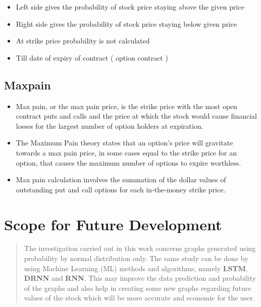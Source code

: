 \begin{multicols}{2}

\begin{itemize}
\tightlist
\item
  Left side gives the probability of stock price staying above the given
  price
\item
  Right side gives the probability of stock price staying below given
  price
\item
  At strike price probability is not calculated
\item
  Till date of expiry of contract ( option contract )
\end{itemize}

\hypertarget{maxpain}{%
\subsection{Maxpain}\label{maxpain}}

\begin{itemize}
\tightlist
\item
  Max pain, or the max pain price, is the strike price with the most
  open contract puts and calls and the price at which the stock would
  cause financial losses for the largest number of option holders at
  expiration.
\item
  The Maximum Pain theory states that an option's price will gravitate
  towards a max pain price, in some cases equal to the strike price for
  an option, that causes the maximum number of options to expire
  worthless.
\item
  Max pain calculation involves the summation of the dollar values of
  outstanding put and call options for each in-the-money strike price.
\end{itemize}

\end{multicols}

\hypertarget{scope-for-future-development}{%
\section{Scope for Future
Development}\label{scope-for-future-development}}

\begin{quote}
The investigation carried out in this work concerns graphs generated
using probability by normal distribution only. The same study can be
done by using Machine Learning (ML) methods and algorithms, namely
\textbf{LSTM}, \textbf{DRNN} and \textbf{RNN}. This may improve the data
prediction and probability of the graphs and also help in creating some
new graphs regarding future values of the stock which will be more
accurate and economic for the user.
\end{quote}

